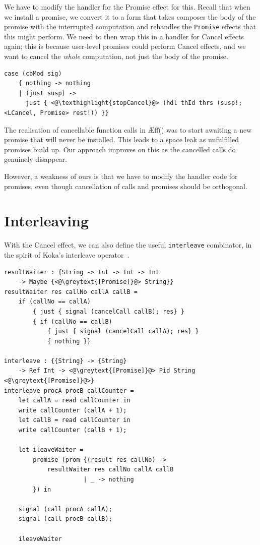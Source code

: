 \documentclass[msc,deptreport,cs]{infthesis} %
\newcommand{\code}[1]{\lstinline{#1}}
\newcommand{\texthighlight}[1]{%
  \colorbox{red!20}{#1}}
\newcommand{\greytext}[1]{\textcolor{black!40}{#1}}
\newcommand\aeff{{\AE}ff\xspace}
\newcommand{\todo}[1]
           {{\par\noindent\small\color{RoyalPurple}
  \framebox{\parbox{\dimexpr\linewidth-2\fboxsep-2\fboxrule}
    {\textbf{TODO:} #1}}}}
\begin{document}
We have to modify the handler for the \textsf{Promise} effect for this. Recall
that when we install a promise, we convert it to a form that takes composes the
body of the promise with the interrupted computation and rehandles the
\code{Promise} effects that this might perform. We need to then wrap this in a
handler for \textsf{Cancel} effects again; this is because user-level promises
could perform \textsf{Cancel} effects, and we want to cancel the \emph{whole}
computation, not just the body of the promise.

\begin{lstlisting}
case (cbMod sig)
    { nothing -> nothing
    | (just susp) ->
      just { <@\texthighlight{stopCancel}@> (hdl thId thrs (susp!; <LCancel, Promise> rest!)) }}
\end{lstlisting}

The realisation of cancellable function calls in
\aeff(\cite{ahman2020asynchronous}) was to start awaiting a new promise that
will never be installed. This leads to a space leak as unfulfilled promises
build up. Our approach improves on this as the cancelled calls do genuinely
disappear.

However, a weakness of ours is that we have to modify the handler code for
promises, even though cancellation of calls and promises should be orthogonal.

\section{Interleaving}

With the \textsf{Cancel} effect, we can also define the useful \code{interleave}
combinator, in the spirit of Koka's interleave
operator~\cite{leijen2017structured}.


\begin{lstlisting}
resultWaiter : {String -> Int -> Int -> Int
    -> Maybe {<@\greytext{[Promise]}@> String}}
resultWaiter res callNo callA callB =
    if (callNo == callA)
        { just { signal (cancelCall callB); res} }
        { if (callNo == callB)
            { just { signal (cancelCall callA); res} }
            { nothing }}

interleave : {{String} -> {String}
    -> Ref Int -> <@\greytext{[Promise]}@> Pid String <@\greytext{[Promise]}@>}
interleave procA procB callCounter =
    let callA = read callCounter in
    write callCounter (callA + 1);
    let callB = read callCounter in
    write callCounter (callB + 1);

    let ileaveWaiter =
        promise (prom {(result res callNo) ->
            resultWaiter res callNo callA callB
                      | _ -> nothing
        }) in

    signal (call procA callA);
    signal (call procB callB);

    ileaveWaiter
\end{lstlisting}
\end{document}
